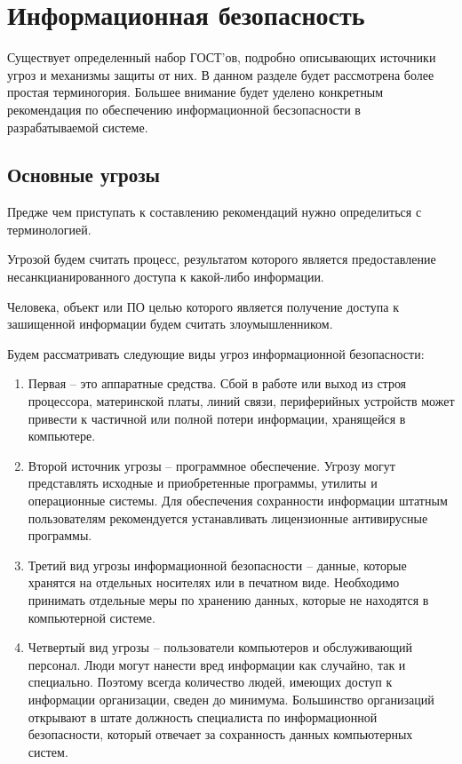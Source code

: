 \newpage
\section{Информационная безопасность}
Существует определенный набор ГОСТ’ов, подробно описывающих источники угроз и
механизмы защиты от них. В данном разделе будет рассмотрена более простая
терминогория. Большее внимание будет уделено конкретным рекомендация по
обеспечению информационной бесзопасности в разрабатываемой системе.

\subsection{Основные угрозы}
Предже чем приступать к составлению рекомендаций нужно определиться с
терминологией.

Угрозой будем считать процесс, результатом которого является предоставление
несанкцианированного доступа к какой-либо информации.

Человека, объект или ПО целью которого является получение доступа к зашищенной
информации будем считать злоумышленником.

Будем рассматривать следующие виды угроз информационной безопасности:

\begin{enumerate}
  \item Первая – это аппаратные средства. Сбой в работе или выход из строя процессора, материнской платы, линий связи, периферийных устройств может привести к частичной или полной потери информации, хранящейся в компьютере.
  \item Второй источник угрозы – программное обеспечение. Угрозу могут
представлять исходные и приобретенные программы, утилиты и операционные системы. Для обеспечения сохранности информации штатным пользователям рекомендуется устанавливать лицензионные антивирусные программы.
  \item Третий вид угрозы информационной безопасности – данные, которые хранятся
на отдельных носителях или в печатном виде. Необходимо принимать отдельные меры по хранению данных, которые не находятся в компьютерной системе.
  \item Четвертый вид угрозы – пользователи компьютеров и обслуживающий
персонал. Люди могут нанести вред информации как случайно, так и специально. Поэтому всегда количество людей, имеющих доступ к информации организации, сведен до минимума. Большинство организаций открывают в штате должность специалиста по информационной безопасности, который отвечает за сохранность данных компьютерных систем.
\end{enumerate}

